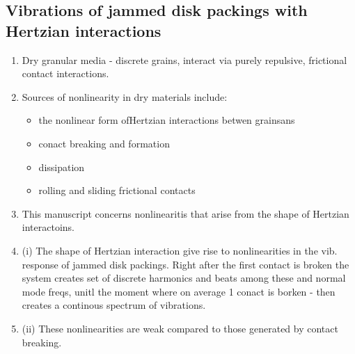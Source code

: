 \documentclass[10pt,a4paper]{article}
\begin{document}
\subsection{Vibrations of jammed disk packings with Hertzian interactions \cite{schreck:13}}
\begin{enumerate}
 \item Dry granular media - discrete grains, interact via purely repulsive, frictional contact interactions.
 \item Sources of nonlinearity in dry materials include:
 \begin{itemize}
  \item the nonlinear form ofHertzian interactions betwen grainsans
  \item conact breaking and formation
  \item dissipation
  \item rolling and sliding frictional contacts
 \end{itemize}
 \item This manuscript concerns nonlinearitis that arise from the shape of Hertzian interactoins.
 \item (i) The shape of Hertzian interaction give rise to nonlinearities in the vib. response of jammed disk packings.
 Right after the first contact is broken the system creates set of discrete harmonics and beats among these and normal mode freqs, 
 unitl the moment where on average 1 conact is borken - then creates a continous spectrum of vibrations. 
 \item (ii) These nonlinearities are weak compared to those generated by contact breaking.

\end{enumerate}
\end{document}
